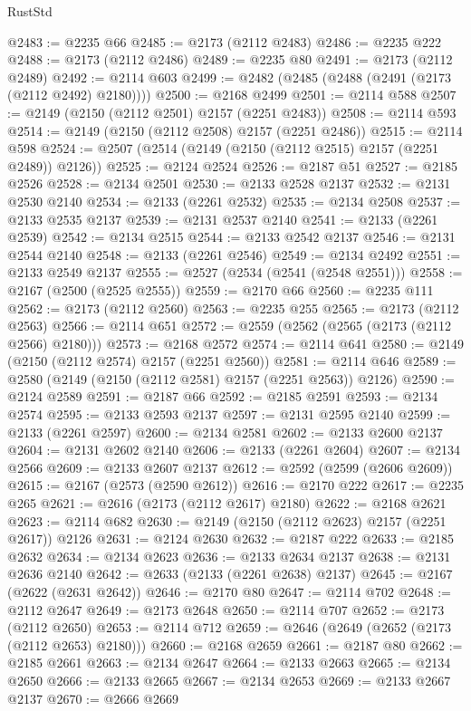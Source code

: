 \begin{lexlean}{RustStd}
\begin{coremodule}
{\begin{coremodule}
{{{{{{{{{{{{{{{{@2483 := @2235 @66
@2485 := @2173 (@2112 @2483)
@2486 := @2235 @222
@2488 := @2173 (@2112 @2486)
@2489 := @2235 @80
@2491 := @2173 (@2112 @2489)
@2492 := @2114 @603
@2499 := @2482 (@2485 (@2488 (@2491 (@2173 (@2112 @2492) @2180))))
@2500 := @2168 @2499
@2501 := @2114 @588
@2507 := @2149 (@2150 (@2112 @2501) @2157 (@2251 @2483))
@2508 := @2114 @593
@2514 := @2149 (@2150 (@2112 @2508) @2157 (@2251 @2486))
@2515 := @2114 @598
@2524 := @2507 (@2514 (@2149 (@2150 (@2112 @2515) @2157 (@2251 @2489)) @2126))
@2525 := @2124 @2524
@2526 := @2187 @51
@2527 := @2185 @2526
@2528 := @2134 @2501
@2530 := @2133 @2528 @2137
@2532 := @2131 @2530 @2140
@2534 := @2133 (@2261 @2532)
@2535 := @2134 @2508
@2537 := @2133 @2535 @2137
@2539 := @2131 @2537 @2140
@2541 := @2133 (@2261 @2539)
@2542 := @2134 @2515
@2544 := @2133 @2542 @2137
@2546 := @2131 @2544 @2140
@2548 := @2133 (@2261 @2546)
@2549 := @2134 @2492
@2551 := @2133 @2549 @2137
@2555 := @2527 (@2534 (@2541 (@2548 @2551)))
@2558 := @2167 (@2500 (@2525 @2555))
@2559 := @2170 @66
@2560 := @2235 @111
@2562 := @2173 (@2112 @2560)
@2563 := @2235 @255
@2565 := @2173 (@2112 @2563)
@2566 := @2114 @651
@2572 := @2559 (@2562 (@2565 (@2173 (@2112 @2566) @2180)))
@2573 := @2168 @2572
@2574 := @2114 @641
@2580 := @2149 (@2150 (@2112 @2574) @2157 (@2251 @2560))
@2581 := @2114 @646
@2589 := @2580 (@2149 (@2150 (@2112 @2581) @2157 (@2251 @2563)) @2126)
@2590 := @2124 @2589
@2591 := @2187 @66
@2592 := @2185 @2591
@2593 := @2134 @2574
@2595 := @2133 @2593 @2137
@2597 := @2131 @2595 @2140
@2599 := @2133 (@2261 @2597)
@2600 := @2134 @2581
@2602 := @2133 @2600 @2137
@2604 := @2131 @2602 @2140
@2606 := @2133 (@2261 @2604)
@2607 := @2134 @2566
@2609 := @2133 @2607 @2137
@2612 := @2592 (@2599 (@2606 @2609))
@2615 := @2167 (@2573 (@2590 @2612))
@2616 := @2170 @222
@2617 := @2235 @265
@2621 := @2616 (@2173 (@2112 @2617) @2180)
@2622 := @2168 @2621
@2623 := @2114 @682
@2630 := @2149 (@2150 (@2112 @2623) @2157 (@2251 @2617)) @2126
@2631 := @2124 @2630
@2632 := @2187 @222
@2633 := @2185 @2632
@2634 := @2134 @2623
@2636 := @2133 @2634 @2137
@2638 := @2131 @2636 @2140
@2642 := @2633 (@2133 (@2261 @2638) @2137)
@2645 := @2167 (@2622 (@2631 @2642))
@2646 := @2170 @80
@2647 := @2114 @702
@2648 := @2112 @2647
@2649 := @2173 @2648
@2650 := @2114 @707
@2652 := @2173 (@2112 @2650)
@2653 := @2114 @712
@2659 := @2646 (@2649 (@2652 (@2173 (@2112 @2653) @2180)))
@2660 := @2168 @2659
@2661 := @2187 @80
@2662 := @2185 @2661
@2663 := @2134 @2647
@2664 := @2133 @2663
@2665 := @2134 @2650
@2666 := @2133 @2665
@2667 := @2134 @2653
@2669 := @2133 @2667 @2137
@2670 := @2666 @2669
}}}}}}}}}}}}}}}}
\end{coremodule}}
\end{coremodule}
\end{lexlean}
